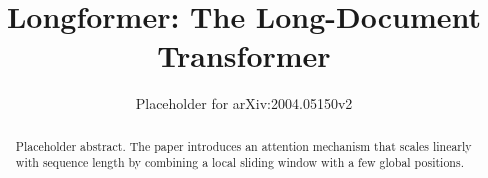 \documentclass[11pt]{article}
\title{Longformer: The Long-Document Transformer}
\author{Placeholder for arXiv:2004.05150v2}
\date{}
\begin{document}
\maketitle

\begin{abstract}
Placeholder abstract. The paper introduces an attention mechanism that scales linearly with sequence length by combining a local sliding window with a few global positions.
\end{abstract}


\end{document}
